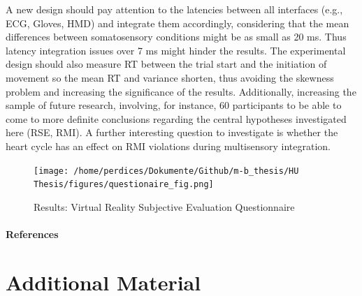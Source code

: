 \documentclass[12pt,oneside,openright]{report}
\begin{document}

A new design should pay attention to the latencies between all interfaces (e.g., ECG, Gloves, HMD) and integrate them accordingly, considering that the mean differences between somatosensory conditions might be as small as 20 ms. Thus latency integration issues over 7 ms might hinder the results. The experimental design should also measure RT between the trial start and the initiation of movement so the mean RT and variance shorten, thus avoiding the skewness problem and increasing the significance of the results. Additionally, increasing the sample of future research, involving, for instance, 60 participants to be able to come to more definite conclusions regarding the central hypotheses investigated here (RSE, RMI). A further interesting question to investigate is whether the heart cycle has an effect on RMI violations during multisensory integration.

\newpage
\begin{figure}[ht]
        \centering
        \texttt{[image: /home/perdices/Dokumente/Github/m-b\_thesis/HU Thesis/figures/questionaire\_fig.png]}
        \caption{Results: Virtual Reality Subjective Evaluation Questionnaire}
        \label{fig:quest}
\end{figure}
\pagebreak



\paragraph{\textbf{References}}
\printbibliography[heading=none]


\pagebreak
\vspace*{\fill}
\section*{\centering Additional Material}
\vspace*{\fill}
\end{document}
